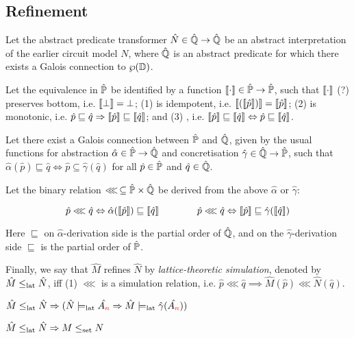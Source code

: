 \subsection{Refinement}

Let the abstract predicate transformer $\hat N \in \hat{\mathbb{Q}} \rightarrow \hat{\mathbb{Q}}$ be an abstract interpretation of the earlier circuit model $N$, where $\hat{\mathbb{Q}}$ is an abstract predicate for which there exists a Galois connection to $\wp(\mathbb{D})$.

Let the equivalence in $\hat{\mathbb{P}}$ be identified by a function $\llbracket \cdot \rrbracket \in \hat{\mathbb{P}} \rightarrow \hat{\mathbb{P}}$, such that $\llbracket \cdot \rrbracket$ (?) preserves bottom, i.e. $\llbracket \bot \rrbracket = \bot$; (1) is idempotent, i.e. $\llbracket ( \llbracket \hat p \rrbracket ) \rrbracket = \llbracket \hat p \rrbracket$; (2) is monotonic, i.e. $\hat p \sqsubseteq \hat q \Rightarrow \llbracket \hat p \rrbracket \sqsubseteq \llbracket \hat q \rrbracket$; and (3) , i.e. $\llbracket \hat p \rrbracket \sqsubseteq \llbracket \hat q \rrbracket \Leftrightarrow \hat p \sqsubseteq \llbracket \hat q \rrbracket$.

Let there exist a Galois connection between $\hat{\mathbb{P}}$ and $\hat{\mathbb{Q}}$, given by the usual functions for abstraction $\hat \alpha \in \hat{\mathbb{P}} \rightarrow \hat{\mathbb{Q}}$ and concretisation $\hat \gamma \in \hat{\mathbb{Q}} \rightarrow \hat{\mathbb{P}}$, such that $\hat \alpha(\hat p) \sqsubseteq \hat q \iff \hat p \subseteq \hat \gamma(\hat q)$ for all $\hat p \in \hat{\mathbb{P}}$ and $\hat q \in \hat{\mathbb{Q}}$.

Let the binary relation $\lll \, \subseteq \hat{\mathbb{P}} \times \hat{\mathbb{Q}}$ be derived from the above $\hat \alpha$ or $\hat \gamma$:

\begin{equation*}
\hat p \lll \hat q \Leftrightarrow \hat \alpha(\llbracket \hat p \rrbracket) \sqsubseteq \llbracket \hat q \rrbracket \quad\quad\quad\quad \hat p \lll \hat q \Leftrightarrow \llbracket \hat p \rrbracket \sqsubseteq \hat \gamma(\llbracket \hat q \rrbracket)
\end{equation*}

\noindent Here $\sqsubseteq$ on $\hat \alpha$-derivation side is the partial order of $\hat{\mathbb{Q}}$, and on the $\hat \gamma$-derivation side $\sqsubseteq$ is the partial order of $\hat{\mathbb{P}}$.

Finally, we say that $\hat M$ refines $\hat N$ by \textit{lattice-theoretic simulation}, denoted by $\hat M \leq_{\textrm{lat}} \hat N$, iff (1) $\lll$ is a simulation relation, i.e. $\hat p \lll \hat q \implies \hat M(\hat p) \lll \hat N(\hat q)$.

\begin{theorem} \label{thm:lat-refines}
$\hat M \leq_{\textrm{lat}} \hat N \Rightarrow (\hat N \models_{\textrm{lat}} \hat {A_{\textcolor{red}{n}}} \Rightarrow \hat M \models_{\textrm{lat}} \hat \gamma(\hat {A_{\textcolor{red}{n}}}))$
\end{theorem}

\begin{theorem} \label{thm:lat-imply-set}
$\hat M \leq_{\textrm{lat}} \hat N \Rightarrow M \leq_{\textrm{set}} N$
\end{theorem}
